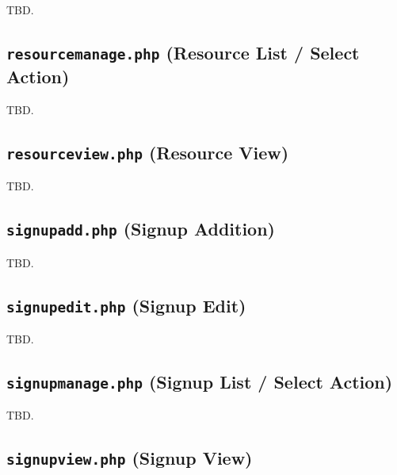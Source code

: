 \documentclass[letterpaper,10pt,titlepage]{article}
\begin{document}
TBD.


\subsection{\texttt{resourcemanage.php} (Resource List / Select Action)}
\label{swpg0:srmg0}

TBD.


\subsection{\texttt{resourceview.php} (Resource View)}
\label{swpg0:srvw0}

TBD.


\subsection{\texttt{signupadd.php} (Signup Addition)}
\label{swpg0:ssad0}

TBD.


\subsection{\texttt{signupedit.php} (Signup Edit)}
\label{swpg0:ssed0}

TBD.


\subsection{\texttt{signupmanage.php} (Signup List / Select Action)}
\label{swpg0:ssmg0}

TBD.


\subsection{\texttt{signupview.php} (Signup View)}
\label{swpg0:ssvw0}
\end{document}
